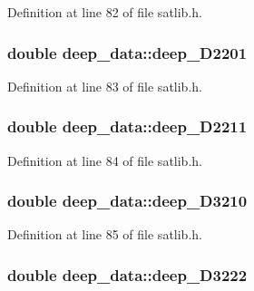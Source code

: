 Definition at line 82 of file satlib.\-h.

\hypertarget{structdeep__data_ac16b78edb009129cc5ba63a684d7df06}{
\subsubsection[{deep\-\_\-\-D2201}]{\setlength{\rightskip}{0pt plus 5cm}double deep\-\_\-data\-::deep\-\_\-\-D2201}}\label{structdeep__data_ac16b78edb009129cc5ba63a684d7df06}


Definition at line 83 of file satlib.\-h.

\hypertarget{structdeep__data_a0e6ac7d14886628f39b2dabbac5e9768}{
\subsubsection[{deep\-\_\-\-D2211}]{\setlength{\rightskip}{0pt plus 5cm}double deep\-\_\-data\-::deep\-\_\-\-D2211}}\label{structdeep__data_a0e6ac7d14886628f39b2dabbac5e9768}


Definition at line 84 of file satlib.\-h.

\hypertarget{structdeep__data_a4d5d625f92b0af3ad25b4a12e4e13a7c}{
\subsubsection[{deep\-\_\-\-D3210}]{\setlength{\rightskip}{0pt plus 5cm}double deep\-\_\-data\-::deep\-\_\-\-D3210}}\label{structdeep__data_a4d5d625f92b0af3ad25b4a12e4e13a7c}


Definition at line 85 of file satlib.\-h.

\hypertarget{structdeep__data_ac121ab6ccd0b99df1566ff2348e75433}{
\subsubsection[{deep\-\_\-\-D3222}]{\setlength{\rightskip}{0pt plus 5cm}double deep\-\_\-data\-::deep\-\_\-\-D3222}}\label{structdeep__data_ac121ab6ccd0b99df1566ff2348e75433}


